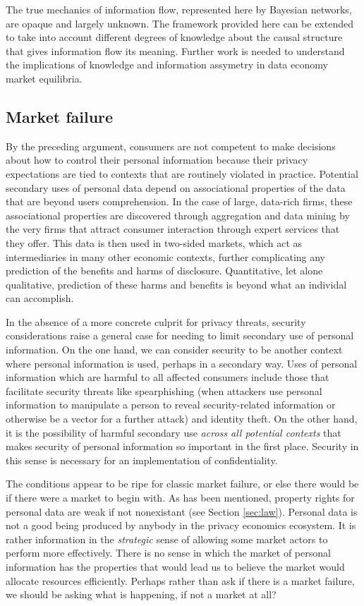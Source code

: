 \documentclass[../thesis.tex]{subfiles}
\begin{document}
The true mechanics of information flow, represented here
by Bayesian networks, are opaque and largely unknown.
The framework provided here can be extended to take into
account different degrees of knowledge about the causal
structure that gives information flow its meaning.
Further work is needed to understand the implications
of knowledge and information assymetry in data economy
market equilibria.

\subsection{Market failure}

By the preceding argument, consumers are not competent
to make decisions about how to control their personal
information because their privacy expectations are
tied to contexts that are routinely violated in practice.
Potential secondary uses of personal data depend on
associational properties of the data that are beyond
users comprehension.
In the case of large, data-rich firms,
these associational properties are
discovered through aggregation and data mining by the
very firms that attract consumer interaction through
expert services that they offer.
This data is then used in two-sided markets, which
act as intermediaries in many other economic contexts,
further complicating any prediction of the benefits
and harms of disclosure.
Quantitative, let alone qualitative, prediction of
these harms and benefits is beyond what an individal
can accomplish.

In the absence of a more concrete culprit for privacy threats,
security considerations raise a general case for needing
to limit secondary use of personal information.
On the one hand, we can consider security to be another
context where personal information is used, perhaps in a
secondary way.
Uses of personal information which are
harmful to all affected consumers include those that facilitate
security threats like spearphishing (when attackers use
personal information to manipulate a person to reveal 
security-related information or otherwise be a vector
for a further attack) and identity theft.
On the other hand, it is the possibility of harmful secondary
use \emph{across all potential contexts} that makes security of
personal information so important in the first place.
Security in this sense is necessary for an implementation of 
confidentiality.

The conditions appear to be ripe for classic market failure,
or else there would be if there were a market to begin
with.
As has been mentioned, property rights for
personal data are weak if not nonexistant (see Section \ref{sec:law}).
Personal data is not a good being produced by anybody
in the privacy economics ecosystem.
It is rather information in the \emph{strategic} sense of
allowing some market actors to perform more effectively.
There is no sense in which the market of personal information
has the properties that would lead us to believe the
market would allocate resources efficiently.
Perhaps rather than ask if there is a market failure,
we should be asking what is happening, if not a market at all?
\end{document}
